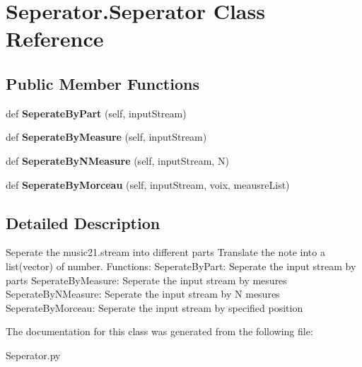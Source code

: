 \hypertarget{class_seperator_1_1_seperator}{}\section{Seperator.\+Seperator Class Reference}
\label{class_seperator_1_1_seperator}
\subsection*{Public Member Functions}
\begin{DoxyCompactItemize}
\item 
\mbox{\label{class_seperator_1_1_seperator_a22103c290db79cd6dbf431277d2f03df}} 
def {\bfseries Seperate\+By\+Part} (self, input\+Stream)
\item 
\mbox{\label{class_seperator_1_1_seperator_a997ebc08f18a66f46c445e6b0c13368a}} 
def {\bfseries Seperate\+By\+Measure} (self, input\+Stream)
\item 
\mbox{\label{class_seperator_1_1_seperator_a05d43389d9c8664998edb13718b45f8d}} 
def {\bfseries Seperate\+By\+N\+Measure} (self, input\+Stream, N)
\item 
\mbox{\label{class_seperator_1_1_seperator_ad37c7abeec17c48dfbb07a3050b9ffda}} 
def {\bfseries Seperate\+By\+Morceau} (self, input\+Stream, voix, meausre\+List)
\end{DoxyCompactItemize}


\subsection{Detailed Description}
\begin{DoxyVerb}Seperate the music21.stream into different parts
Translate the note into a list(vector) of number.
Functions:
    SeperateByPart: Seperate the input stream by parts
    SeperateByMeasure: Seperate the input stream by mesures
    SeperateByNMeasure: Seperate the input stream by N mesures
    SeperateByMorceau: Seperate the input stream by specified position
\end{DoxyVerb}
 

The documentation for this class was generated from the following file\+:\begin{DoxyCompactItemize}
\item 
Seperator.\+py\end{DoxyCompactItemize}
